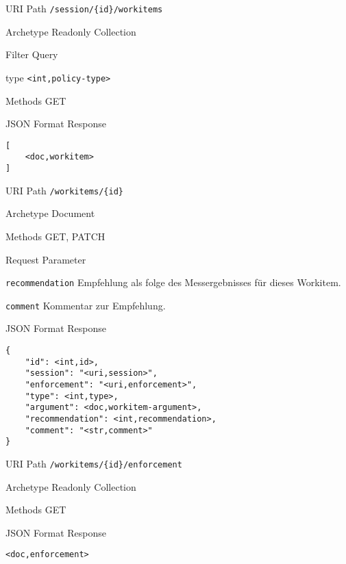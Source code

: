 \documentclass[10pt,a4paper]{scrartcl}
\begin{document}
\begin{mdframed}[style=def]
\begin{description*}
	\item[URI Path] \texttt{/session/\{id\}/workitems}
	\item[Archetype] Readonly Collection
	\item[Filter Query] \hfill
	\begin{description*}
	    \item[type] \texttt{<int,policy-type>}
	\end{description*}
	\item[Methods] GET
	\item[JSON Format Response] \hfill
\begin{lstlisting}
[
	<doc,workitem>
]
\end{lstlisting}
\end{description*}
\end{mdframed}


\begin{mdframed}[style=def]
\begin{description*}
	\item[URI Path] \texttt{/workitems/\{id\}}
	\item[Archetype] Document
	\item[Methods] GET, PATCH
	\item[Request Parameter] \hfill
    \begin{description*}
        \item[\texttt{recommendation}] Empfehlung als folge des Messergebnisses für dieses Workitem.
        \item[\texttt{comment}] Kommentar zur Empfehlung.
    \end{description*}
	\item[JSON Format Response] \hfill
\begin{lstlisting}
{
	"id": <int,id>,
	"session": "<uri,session>",
	"enforcement": "<uri,enforcement>",
	"type": <int,type>,
	"argument": <doc,workitem-argument>,
	"recommendation": <int,recommendation>,
	"comment": "<str,comment>"
}
\end{lstlisting}
\end{description*}
\end{mdframed}

\begin{mdframed}[style=def]
\begin{description*}
	\item[URI Path] \texttt{/workitems/\{id\}/enforcement}
	\item[Archetype] Readonly Collection
	\item[Methods] GET
	\item[JSON Format Response] \hfill
\begin{lstlisting}
<doc,enforcement>
\end{lstlisting}
\end{description*}
\end{mdframed}
\end{document}
